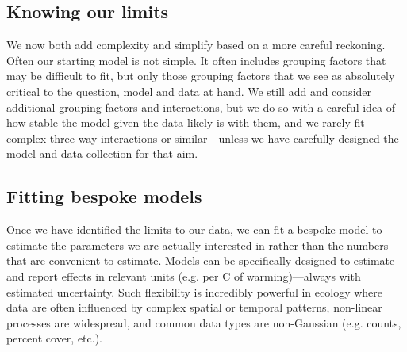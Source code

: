 
 \subsection*{Knowing our limits}  %

We now both add complexity and simplify based on a more careful reckoning. Often our starting model is not simple.  It often includes grouping factors that may be difficult to fit, but only those grouping factors that we see as absolutely critical to the question, model and data at hand. We still add and consider additional grouping factors and interactions, but we do so with a careful idea of how stable the model given the data likely is with them, and we rarely fit complex three-way interactions or similar---unless we have carefully designed the model and data collection for that aim. %

 \subsection*{Fitting bespoke models} 
Once we have identified the limits to our data, we can fit a bespoke model to estimate the parameters we are actually interested in rather than the numbers that are convenient to estimate. Models can be specifically designed to estimate and report effects in relevant units (e.g. per \degree C of warming)---always with estimated uncertainty. Such flexibility is incredibly powerful in ecology where data are often influenced by complex spatial or temporal patterns, non-linear processes are widespread, and common data types are non-Gaussian (e.g. counts, percent cover, etc.). 

